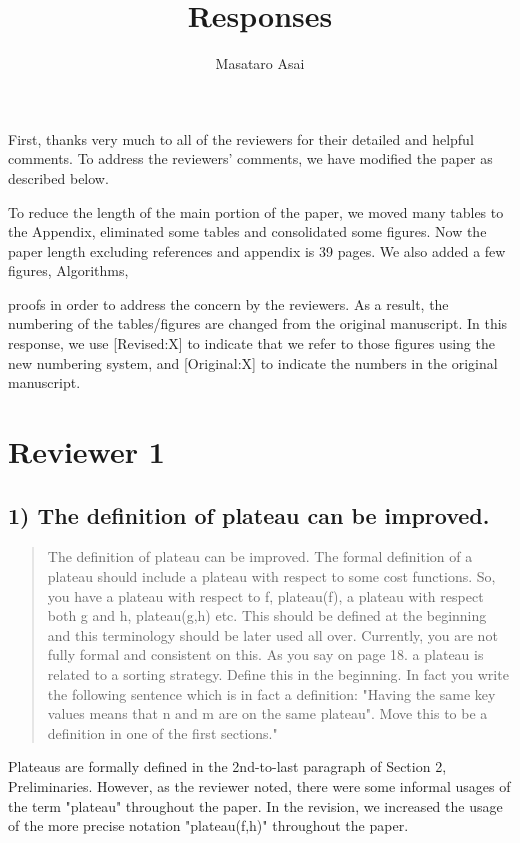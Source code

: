 \documentclass{article}
\author{Masataro Asai}
\date{}
\title{Responses}
\begin{document}
\maketitle
First, thanks very much to all of the reviewers for their detailed and helpful comments.
To address the reviewers' comments, we have modified the paper as described below.

To reduce the length of the main portion of the paper, we moved many tables to the Appendix, 
eliminated some tables and consolidated some figures.
Now the paper length excluding references and appendix is 39 pages.
We also added a few figures, Algorithms,

proofs in order to address the concern by the reviewers.
As a result, the numbering of the tables/figures are changed from the original manuscript.
In this response, we use [Revised:X] to indicate that we refer to those figures using
the new numbering system, and [Original:X] to indicate the numbers in the original manuscript.

\section{Reviewer 1}
\label{sec:orgheadline13}

\subsection{1) The definition of plateau can be improved.}
\label{sec:orgheadline1}

\begin{quote}
The definition of plateau can be improved. The formal definition of
a plateau should include a plateau with respect to some cost
functions. So, you have a plateau with respect to f, plateau(f), a
plateau with respect both g and h, plateau(g,h) etc. This should be
defined at the beginning and this terminology should be later used all
over. Currently, you are not fully formal and consistent on this. As
you say on page 18. a plateau is related to a sorting strategy. Define
this in the beginning. In fact you write the following sentence which
is in fact a definition: "Having the same key values means that n and
m are on the same plateau". Move this to be a definition in one of the
first sections."
\end{quote}

Plateaus are formally defined in the 2nd-to-last paragraph of Section 2, Preliminaries.
However, as the reviewer noted, there were some informal usages of the term "plateau" throughout the paper.
In the revision, we increased the usage of the more precise notation "plateau(f,h)" throughout the paper.
\end{document}
